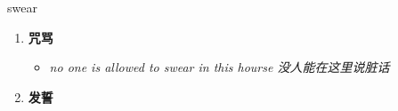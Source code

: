 
\begin{frame}
{\huge swear}
\begin{center}
\begin{enumerate}\Large
  \item \textbf{咒骂}
  \begin{itemize}
    \item \em{\Large{no one is allowed to swear in this hourse 没人能在这里说脏话}}
  \end{itemize}
  \item \textbf{发誓}
\end{enumerate}
\end{center}
\end{frame}
